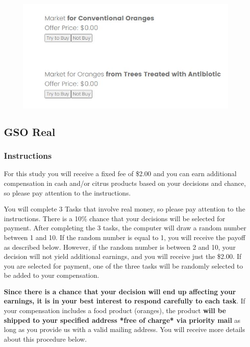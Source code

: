 \documentclass[12pt]{article}
\begin{document}
\begin{figure}[H]
    \centering
    \includegraphics[width=\linewidth]{GSO.JPG}
    \caption{}
    \label{fig:Appendix_GSO_game}
\end{figure}
 

\clearpage



\subsection{GSO Real}

\subsubsection*{Instructions}

For this study you will receive a fixed fee of \$2.00 and you can earn additional compensation in cash and/or citrus products based on your decisions and chance, so please pay attention to the instructions.
 
You will complete 3 Tasks that involve real money, so please pay attention to the instructions. There is a 10\% chance that your decisions will be selected for payment. After completing the 3 tasks, the computer will draw a random number between 1 and 10. If the random number is equal to 1, you will receive the payoff as described below.
However, if the random number is between 2 and 10, your decision will not yield additional earnings, and you will receive just the \$2.00. If you are selected for payment, one of the three tasks will be randomly selected to be added to your compensation.

\textbf{Since there is a chance that your decision will end up affecting your earnings, it is in your best interest to respond carefully to each task}. If your compensation includes a food product (oranges), the product \textbf{will be shipped to your specified address *free of charge* via priority mail} as long as you provide us with a valid mailing address. You will receive more details about this procedure below.
\end{document}
